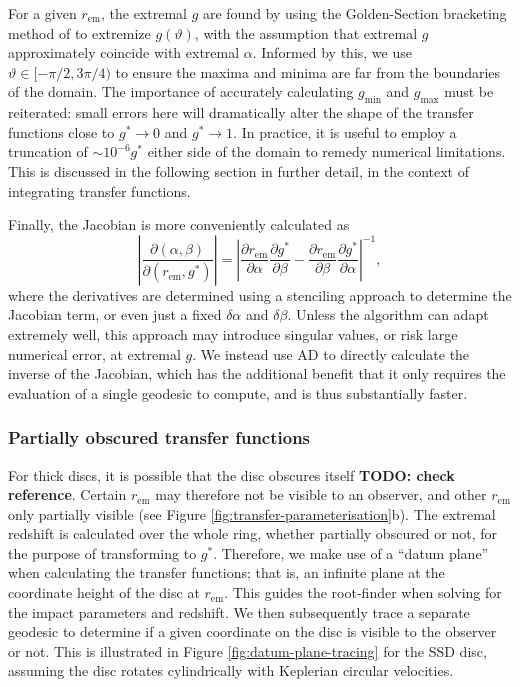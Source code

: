 \documentclass[fleqn,usenatbib]{mnras}
\newcommand{\todo}[1]{{\noindent \bf \color{red} TODO: #1}}
\newcommand{\pderiv}[2]{\frac{\partial #1}{\partial #2}}
\begin{document}
For a given $r_\text{em}$, the extremal $g$ are found by using the Golden-Section bracketing method of \cite{optimize.jl} to extremize $g(\vartheta)$, with the assumption that extremal $g$ approximately coincide with extremal $\alpha$. Informed by this, we use $\vartheta \in [ -\pi/2, 3\pi/4 )$ to ensure the maxima and minima are far from the boundaries of the domain. The importance of accurately calculating $g_\text{min}$ and $g_\text{max}$ must be reiterated: small errors here will dramatically alter the shape of the transfer functions close to $g^\ast \rightarrow 0$ and $g^\ast \rightarrow 1$. In practice, it is useful to employ a truncation of $\sim 10^{-6}g^\ast$ either side of the
domain to remedy numerical limitations. This is discussed in the following section in further detail, in the context of integrating transfer functions.

Finally, the Jacobian is more conveniently calculated as
\begin{equation}
    \left\lvert
    \pderiv{(\alpha, \beta)}{(r_\text{em}, g^\ast)}
    \right\rvert
    =
    \left\lvert
    \pderiv{r_\text{em}}{\alpha}\pderiv{g^\ast}{\beta}
    -
    \pderiv{r_\text{em}}{\beta}\pderiv{g^\ast}{\alpha}
    \right\rvert^{-1},
\end{equation}
where the derivatives are determined using a stenciling approach to determine the Jacobian term, or even just a fixed $\delta \alpha$ and $\delta \beta$. Unless the algorithm can adapt extremely well, this approach may introduce singular values, or risk large numerical error, at extremal $g$. We instead use AD to directly calculate the inverse of the Jacobian, which has the additional benefit that it only requires the evaluation of a single geodesic to compute, and is thus substantially faster.

\subsubsection{Partially obscured transfer functions}

For thick discs, it is possible that the disc obscures itself \citep{taylor_x-ray_2018} \todo{check reference}. Certain $r_\text{em}$ may therefore not be visible to an observer, and other $r_\text{em}$ only partially visible (see Figure \ref{fig:transfer-parameterisation}b). The extremal redshift is calculated over the whole ring, whether partially obscured or not, for the purpose of transforming to $g^\ast$. Therefore, we make use of a ``datum plane'' when calculating the transfer functions; that is, an infinite plane at the coordinate height of the disc at $r_\text{em}$. This guides the root-finder when solving for the impact parameters and redshift. We then subsequently trace a separate geodesic to determine if a given coordinate on the disc is visible to the observer or not. This is illustrated in Figure \ref{fig:datum-plane-tracing} for the SSD disc, assuming the disc rotates cylindrically with Keplerian circular velocities.
\end{document}
